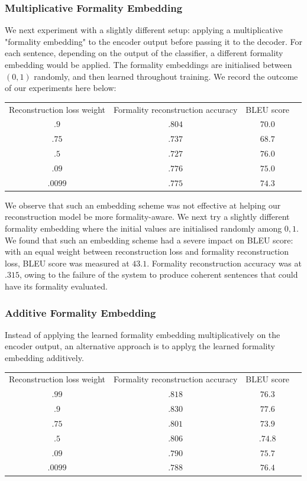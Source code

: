 \documentclass[11pt]{article}
\begin{document}
\subsubsection{Multiplicative Formality Embedding}

We next experiment with a slightly different setup: applying a multiplicative "formality embedding" to the encoder output before passing it to the decoder. For each sentence, depending on the output of the classifier, a different formality embedding would be applied. The formality embeddings are initialised between $(0, 1)$ randomly, and then learned throughout training. We record the outcome of our experiments here below:

\begin{tabular}{ c c c c }
    Reconstruction loss weight & Formality reconstruction accuracy & BLEU score \\
    $.9$ & $.804$ & $70.0$ \\
    $.75$ & $.737$ & $68.7$ \\
    $.5$ & $.727$ & $76.0$ \\
    $.09$ & $.776$ & $75.0$ \\
    $.0099$ & $.775$ & $74.3$ \\
\end{tabular}

We observe that such an embedding scheme was not effective at helping our reconstruction model be more formality-aware. We next try a slightly different formality embedding where the initial values are initialised randomly among ${0, 1}$. We found that such an embedding scheme had a severe impact on BLEU score: with an equal weight between reconstruction loss and formality reconstruction loss, BLEU score was measured at $43.1$. Formality reconstruction accuracy was at $.315$, owing to the failure of the system to produce coherent sentences that could have its formality evaluated. 

\subsubsection{Additive Formality Embedding}

Instead of applying the learned formality embedding multiplicatively on the encoder output, an alternative approach is to applyg the learned formality embedding additively. 

\begin{tabular}{ c c c c }
    Reconstruction loss weight & Formality reconstruction accuracy & BLEU score \\
    $.99$ & $.818$ & $76.3$ \\
    $.9$ & $.830$ & $77.6$ \\
    $.75$ & $.801$ & $73.9$ \\
    $.5$ & $.806$ & $.74.8$ \\
    $.09$ & $.790$ & $75.7$ \\
    $.0099$ & $.788$ & $76.4$ \\
\end{tabular}
\end{document}
